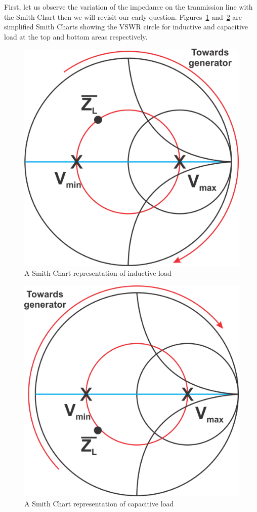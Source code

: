 First, let us observe the variation of the impedance on the tranmission line with the Smith Chart then we will revisit our early question. Figures~\ref{fig:group91} and~\ref{fig:group92} are simplified Smith Charts showing the VSWR circle for inductive and capacitive load at the top and bottom areas respectively.
\begin{figure}[h]
\centering
\includegraphics[scale=0.4]{./graphics/Group91}
\caption{A Smith Chart representation of inductive load}
\label{fig:group91}
\end{figure}
\begin{figure}[h]
\centering
\includegraphics[scale=0.4]{./graphics/Group92}
\caption{A Smith Chart representation of capacitive load}
\label{fig:group92}
\end{figure}

